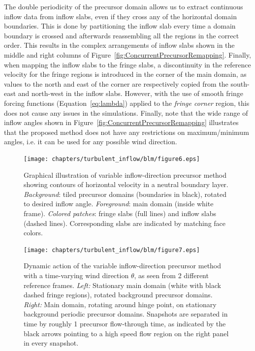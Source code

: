 	The double periodicity of the precursor domain allows us to extract continuous inflow data from inflow slabs, even if they cross any of the horizontal domain boundaries. This is done by partitioning the inflow slab every time a domain boundary is crossed and afterwards reassembling all the regions in the correct order. This results in the complex arrangements of inflow slabs shown in the middle and right columns of Figure~\ref{fig:ConcurrentPrecursorRemapping}.
	Finally, when mapping the inflow slabs to the fringe slabs, a discontinuity in the reference velocity for the fringe regions is introduced in the corner of the main domain, as values to the north and east of the corner are respectively copied from the south-east and north-west in the inflow slabs. However, with  the use of smooth fringe forcing functions (Equation~\ref{eq:lambda}) applied to the \emph{fringe corner} region, this does not cause any issues in the simulations. Finally, note that the wide range of inflow angles shown in Figure~\ref{fig:ConcurrentPrecursorRemapping} illustrates that the proposed method does not have any restrictions on maximum/minimum angles, i.e. it can be used for any possible wind direction.
	
	\begin{figure}[ht!]
		\centering
		\texttt{[image: chapters/turbulent\_inflow/blm/figure6.eps]}
		\caption{Graphical illustration of variable inflow-direction precursor method showing contours of horizontal velocity in a neutral boundary layer. \emph{Background}: tiled precursor domains (boundaries in black), rotated to desired inflow angle. \emph{Foreground}: main domain (inside white frame). \emph{Colored patches}: fringe slabs (full lines) and inflow slabs (dashed lines). Corresponding slabs are indicated by matching face colors.}
		\label{fig:ConcurrentPrecursorField}
	\end{figure}
	\begin{figure}[h!]
		\centering
		\texttt{[image: chapters/turbulent\_inflow/blm/figure7.eps]}
		\caption{Dynamic action of the variable inflow-direction precursor method with a time-varying wind direction $\theta$, as seen from 2 different reference frames. \emph{Left:} Stationary main domain (white with black dashed fringe regions), rotated background precursor domains. \emph{Right:} Main domain, rotating around hinge point, on stationary background periodic precursor domains. Snapshots are separated in time by roughly 1 precursor flow-through time, as indicated by the black arrows pointing to a high speed flow region on the right panel in every snapshot.}
		\label{fig:ConcurrentPrecursorRotating}
	\end{figure}
	
